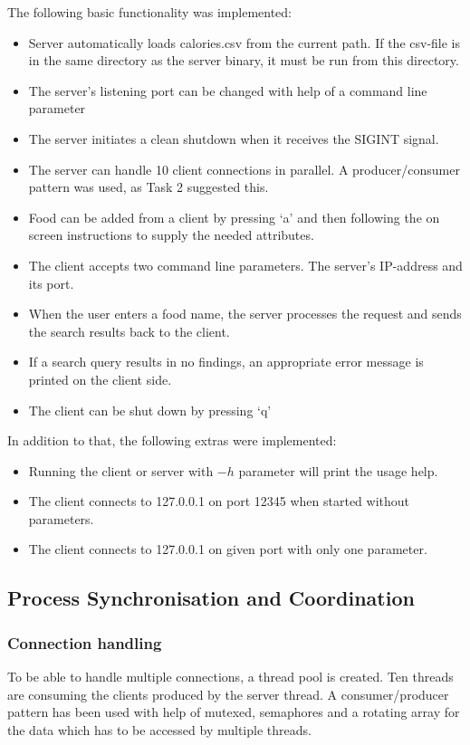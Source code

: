 \documentclass[a4paper, 12pt]{scrartcl} %
\begin{document}
The following basic functionality was implemented:
\begin{itemize}
    \item Server automatically loads calories.csv from the current path. If the
      csv-file is in the same directory as the server binary, it must be run
      from this directory.
    \item The server's listening port can be changed with help of a command
      line parameter
    \item The server initiates a clean shutdown when it receives the SIGINT
      signal.
    \item The server can handle 10 client connections in parallel. A
      producer/consumer pattern was used, as Task 2 suggested this.
    \item Food can be added from a client by pressing `a' and then following
      the on screen instructions to supply the needed attributes.
    \item The client accepts two command line parameters. The server's
      IP-address and its port.
    \item When the user enters a food name, the server processes the request
      and sends the search results back to the client.
    \item If a search query results in no findings, an appropriate error message
      is printed on the client side.
    \item The client can be shut down by pressing `q'
  \end{itemize}

In addition to that, the following extras were implemented:
\begin{itemize}
  \item Running the client or server with $-h$ parameter will print the usage help.
    \item The client connects to 127.0.0.1 on port 12345 when started without parameters.
    \item The client connects to 127.0.0.1 on given port with only one parameter.
\end{itemize}

\subsection{Process Synchronisation and Coordination}

\subsubsection{Connection handling}
To be able to handle multiple connections, a thread pool is created. Ten threads are consuming the clients produced by the server thread. A consumer/producer pattern has been used with help of mutexed, semaphores and a rotating array for the data which has to be accessed by multiple threads.
\end{document}
